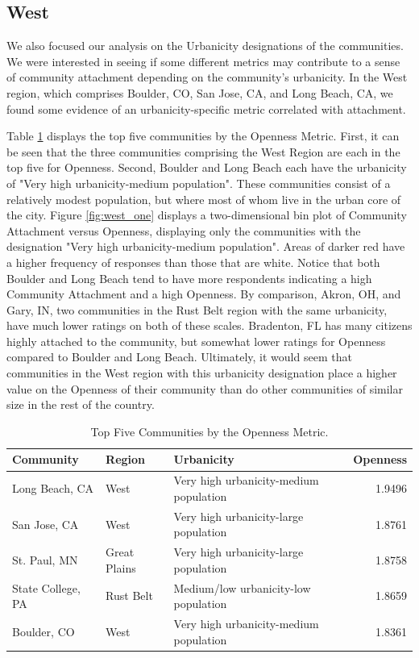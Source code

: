 \documentclass[11pt]{article}\usepackage{knitr}
\begin{document}
\subsection*{West}
We also focused our analysis on the Urbanicity designations of the communities. We were interested in seeing if some different metrics may contribute to a sense of community attachment depending on the community's urbanicity. In the West region, which comprises Boulder, CO, San Jose, CA, and Long Beach, CA, we found some evidence of an urbanicity-specific metric correlated with attachment.

Table \ref{tbl:open_table} displays the top five communities by the Openness Metric. First, it can be seen that the three communities comprising the West Region are each in the top five for Openness. Second, Boulder and Long Beach each have the urbanicity of "Very high urbanicity-medium population". These communities consist of a relatively modest population, but where most of whom live in the urban core of the city. Figure \ref{fig:west_one} displays a two-dimensional bin plot of Community Attachment versus Openness, displaying only the communities with the designation "Very high urbanicity-medium population". Areas of darker red have a higher frequency of responses than those that are white. Notice that both Boulder and Long Beach tend to have more respondents indicating a high Community Attachment and a high Openness. By comparison, Akron, OH, and Gary, IN, two communities in the Rust Belt region with the same urbanicity, have much lower ratings on both of these scales. Bradenton, FL has many citizens highly attached to the community, but somewhat lower ratings for Openness compared to Boulder and Long Beach. Ultimately, it would seem that communities in the West region with this urbanicity designation place a higher value on the Openness of their community than do other communities of similar size in the rest of the country.

\begin{table}[ht]
\centering
\begin{tabular}{lllr}
  \hline
Community & Region & Urbanicity & Openness \\ 
  \hline
Long Beach, CA & West & Very high urbanicity-medium population & 1.9496 \\ 
  San Jose, CA & West & Very high urbanicity-large population & 1.8761 \\ 
  St. Paul, MN & Great Plains & Very high urbanicity-large population & 1.8758 \\ 
  State College, PA & Rust Belt & Medium/low urbanicity-low population & 1.8659 \\ 
  Boulder, CO & West & Very high urbanicity-medium population & 1.8361 \\ 
   \hline
\end{tabular}
\caption{Top Five Communities by the Openness Metric.} 
\label{tbl:open_table}
\end{table}
\end{document}
